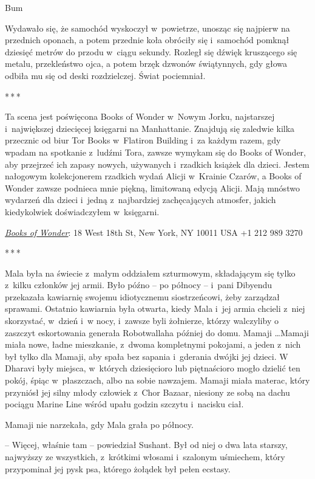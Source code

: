 \documentclass[oneside,polish,11pt,rmheadings]{mwbk}
\newcommand{\threeast}{\par\centerline{*\,*\,*}\medskip\par}
\begin{document}
Bum


Wydawało się, że samochód wyskoczył w~powietrze, unosząc się najpierw na przednich oponach, a potem przednie koła obróciły się i~samochód pomknął dziesięć metrów do przodu w~ciągu sekundy. Rozległ się dźwięk kruszącego się metalu, przekleństwo ojca, a potem brzęk dzwonów świątynnych, gdy głowa odbiła mu się od deski rozdzielczej. Świat pociemniał. 


\bigskip
\threeast


Ta scena jest poświęcona Books of Wonder w~Nowym Jorku, najstarszej i~największej dziecięcej księgarni na Manhattanie. Znajdują się zaledwie kilka przecznic od biur Tor Books w~Flatiron Building i~za każdym razem, gdy wpadam na spotkanie z~ludźmi Tora, zawsze wymykam się do Books of Wonder, aby przejrzeć ich zapasy nowych, używanych i~rzadkich książek dla dzieci. Jestem nałogowym kolekcjonerem rzadkich wydań Alicji w~Krainie Czarów, a Books of Wonder zawsze podnieca mnie piękną, limitowaną edycją Alicji. Mają mnóstwo wydarzeń dla dzieci i~jedną z~najbardziej zachęcających atmosfer, jakich kiedykolwiek doświadczyłem w~księgarni. 


\href{https://booksofwonder.com/}{\textit{Books of Wonder}}: 18 West 18th St, New York, NY 10011 USA +1 212 989 3270 

\bigskip
\threeast

Mala była na świecie z~małym oddziałem szturmowym, składającym się tylko z~kilku członków jej armii. Było późno -- po północy -- i~pani Dibyendu przekazała kawiarnię swojemu idiotycznemu siostrzeńcowi, żeby zarządzał sprawami. Ostatnio kawiarnia była otwarta, kiedy Mala i~jej armia chcieli z~niej skorzystać, w~dzień i~w nocy, i~zawsze byli żołnierze, którzy walczyliby o zaszczyt eskortowania generała Robotwallaha później do domu. Mamaji \ldots Mamaji miała nowe, ładne mieszkanie, z~dwoma kompletnymi pokojami, a jeden z~nich był tylko dla Mamaji, aby spała bez sapania i~gderania dwójki jej dzieci. W Dharavi były miejsca, w~których dziesięcioro lub piętnaścioro mogło dzielić ten pokój, śpiąc w~płaszczach, albo na sobie nawzajem. Mamaji miała materac, który przyniósł jej silny młody człowiek z~Chor Bazaar, niesiony ze sobą na dachu pociągu Marine Line wśród upału godzin szczytu i~nacisku ciał. 


Mamaji nie narzekała, gdy Mala grała po północy. 


-- Więcej, właśnie tam -- powiedział Sushant. Był od niej o dwa lata starszy, najwyższy ze wszystkich, z~krótkimi włosami i~szalonym uśmiechem, który przypominał jej pysk psa, którego żołądek był pełen ecstasy. 
\end{document}
